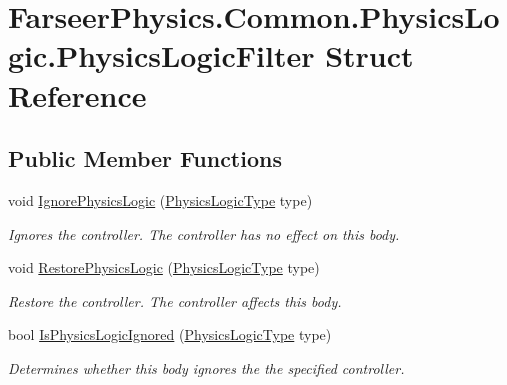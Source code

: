 \hypertarget{struct_farseer_physics_1_1_common_1_1_physics_logic_1_1_physics_logic_filter}{\section{Farseer\+Physics.\+Common.\+Physics\+Logic.\+Physics\+Logic\+Filter Struct Reference}
\label{struct_farseer_physics_1_1_common_1_1_physics_logic_1_1_physics_logic_filter}
}
\subsection*{Public Member Functions}
\begin{DoxyCompactItemize}
\item 
void \hyperlink{struct_farseer_physics_1_1_common_1_1_physics_logic_1_1_physics_logic_filter_a1043b5d89f8d7f29bb59ba45c470094f}{Ignore\+Physics\+Logic} (\hyperlink{namespace_farseer_physics_1_1_common_1_1_physics_logic_a2d07851d80889d4aae171f9d9fc81feb}{Physics\+Logic\+Type} type)
\begin{DoxyCompactList}\small\item\em Ignores the controller. The controller has no effect on this body. \end{DoxyCompactList}\item 
void \hyperlink{struct_farseer_physics_1_1_common_1_1_physics_logic_1_1_physics_logic_filter_a6602d4eca9c6fcfadb39dd2aae328109}{Restore\+Physics\+Logic} (\hyperlink{namespace_farseer_physics_1_1_common_1_1_physics_logic_a2d07851d80889d4aae171f9d9fc81feb}{Physics\+Logic\+Type} type)
\begin{DoxyCompactList}\small\item\em Restore the controller. The controller affects this body. \end{DoxyCompactList}\item 
bool \hyperlink{struct_farseer_physics_1_1_common_1_1_physics_logic_1_1_physics_logic_filter_ab79fcd1f8408af5bd17e0534424da9c6}{Is\+Physics\+Logic\+Ignored} (\hyperlink{namespace_farseer_physics_1_1_common_1_1_physics_logic_a2d07851d80889d4aae171f9d9fc81feb}{Physics\+Logic\+Type} type)
\begin{DoxyCompactList}\small\item\em Determines whether this body ignores the the specified controller. \end{DoxyCompactList}\end{DoxyCompactItemize}
